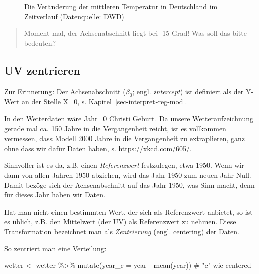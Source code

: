 \documentclass[
  a4paper,
]{scrbook}
\newenvironment{Shaded}{\begin{snugshade}}{\end{snugshade}}
\newcommand{\AttributeTok}[1]{\textcolor[rgb]{0.40,0.45,0.13}{#1}}
\newcommand{\CommentTok}[1]{\textcolor[rgb]{0.37,0.37,0.37}{#1}}
\newcommand{\FunctionTok}[1]{\textcolor[rgb]{0.28,0.35,0.67}{#1}}
\newcommand{\NormalTok}[1]{\textcolor[rgb]{0.00,0.23,0.31}{#1}}
\newcommand{\OtherTok}[1]{\textcolor[rgb]{0.00,0.23,0.31}{#1}}
\newcommand{\SpecialCharTok}[1]{\textcolor[rgb]{0.37,0.37,0.37}{#1}}
\theoremstyle{definition}
\theoremstyle{definition}
\theoremstyle{definition}
\theoremstyle{remark}
\begin{document}
\begin{figure}
\begin{minipage}{0.50\linewidth}
{}


\end{minipage}%

\caption{\label{fig-wetter1}Die Veränderung der mittleren Temperatur in
Deutschland im Zeitverlauf (Datenquelle: DWD)}

\end{figure}%

\begin{quote}
{} Moment mal, der Achsenabschnitt liegt bei -15 Grad!
Was soll das bitte bedeuten?
\end{quote}

\subsection{UV zentrieren}\label{uv-zentrieren}

Zur Erinnerung: Der Achsenabschnitt (\(\beta_0\); engl.
\emph{intercept}) ist definiert als der Y-Wert an der Stelle X=0, s.
Kapitel~\ref{sec-interpret-reg-mod}.

In den Wetterdaten wäre Jahr=0 Christi Geburt. Da unsere
Wetteraufzeichnung gerade mal ca. 150 Jahre in die Vergangenheit reicht,
ist es vollkommen vermessen, dass Modell 2000 Jahre in die Vergangenheit
zu extraplieren, ganz ohne dass wir dafür Daten haben, s.
\url{https://xkcd.com/605/}.

Sinnvoller ist es da, z.B. einen \emph{Referenzwert} festzulegen, etwa
1950. Wenn wir dann von allen Jahren 1950 abziehen, wird das Jahr 1950
zum neuen Jahr Null. Damit bezöge sich der Achsenabschnitt auf das Jahr
1950, was Sinn macht, denn für dieses Jahr haben wir Daten.

Hat man nicht einen bestimmten Wert, der sich als Referenzwert anbietet,
so ist es üblich, z.B. den Mittelwert (der UV) als Referenzwert zu
nehmen. Diese Transformation bezeichnet man als \emph{Zentrierung}
(engl. centering) der Daten.

So zentriert man eine Verteilung:

\begin{Shaded}
\begin{Highlighting}[]
\NormalTok{wetter }\OtherTok{\textless{}{-}}
\NormalTok{  wetter }\SpecialCharTok{\%\textgreater{}\%} 
  \FunctionTok{mutate}\NormalTok{(}\AttributeTok{year\_c =}\NormalTok{ year }\SpecialCharTok{{-}} \FunctionTok{mean}\NormalTok{(year))  }\CommentTok{\# "c" wie centered}
\end{Highlighting}
\end{Shaded}
\end{document}

